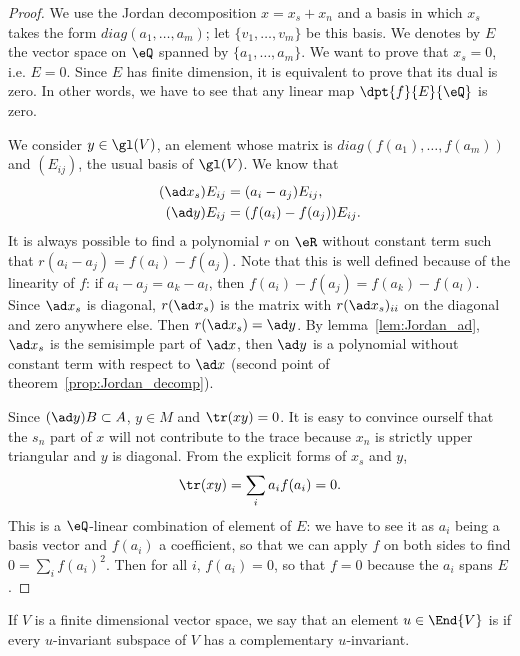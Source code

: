 \begin{proof}
	We use the Jordan decomposition $x=x_s+x_n$ and a basis in which $x_s$ takes the form $diag(a_1,\ldots,a_m)$; let $\{v_1,\ldots,v_m\}$ be this basis. We denotes by $E$ the vector space on $\eQ$ spanned by $\{a_1,\ldots,a_m\}$. We want to prove that $x_s=0$, i.e. $E=0$. Since $E$ has finite dimension, it is equivalent to prove that its dual is zero. In other words, we have to see that any linear map $\dpt{f}{E}{\eQ}$ is zero.

	We consider $y\in\gl(V)$, an element whose matrix is $diag(f(a_1),\ldots,f(a_m))$ and $(E_{ij})$, the usual basis of $\gl(V)$. We know that
	\begin{subequations}
		\begin{align}
			(\ad x_s)E_{ij} & =(a_i-a_j)E_{ij},       \\
			(\ad y)E_{ij}   & =(f(a_i)-f(a_j))E_{ij}.
		\end{align}
	\end{subequations}
	It is always possible to find a polynomial $r$ on $\eR$ without constant term such that $r(a_i-a_j)=f(a_i)-f(a_j)$. Note that this is well defined because of the linearity of $f$: if $a_i-a_j=a_k-a_l$, then $f(a_i)-f(a_j)=f(a_k)-f(a_l)$. Since $\ad x_s$ is diagonal, $r(\ad x_s)$ is the matrix with $r(\ad x_s)_{ii}$ on the diagonal and zero anywhere else. Then $r(\ad x_s)=\ad y$. By lemma~\ref{lem:Jordan_ad}, $\ad x_s$ is the semisimple part of $\ad x$, then $\ad y$ is  a polynomial without constant term with respect to $\ad x$ (second point of theorem~\ref{prop:Jordan_decomp}).

	Since $(\ad y)B\subset A$, $y\in M$ and $\tr(xy)=0$. It is easy to convince ourself that the $s_n$ part of $x$ will not contribute to the trace because $x_n$ is strictly upper triangular and $y$ is diagonal. From the explicit forms of $x_s$ and $y$,
	\[
		\tr(xy)=\sum_ia_if(a_i)=0.
	\]
	This is a $\eQ$-linear combination of element of $E$: we have to see it as $a_i$ being a basis vector and $f(a_i)$ a coefficient, so that we can apply $f$ on both sides to find $0=\sum_if(a_i)^2$. Then for all $i$, $f(a_i)=0$, so that $f=0$ because  the $a_i$ spans $E$.
\end{proof}

\begin{definition}
	If $V$ is a finite dimensional vector space, we say that an element $u\in\End{V}$ is \label{pg:def_semisimple} if every \( u\)-invariant subspace of \( V\) has a complementary \( u\)-invariant.
\end{definition}

